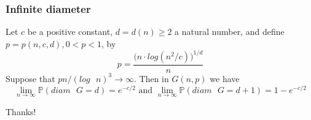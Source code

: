 \documentclass[handout]{beamer}
\theoremstyle{plain}
\renewcommand{\P}{\mathbb{P}}
\begin{document}
\begin{frame}\frametitle{Infinite  diameter}
\begin{theorem}
Let $c$ be a positive constant, $d=d(n)\geq 2$ a natural number, and define $p=p(n,c,d), 0<p<1$, by
$$p = \frac{\big( n\cdot log(n^2/c)\big) ^{1/d}}{n}$$
Suppose that $pn/(log\text{ }n)^{3} \to \infty$. Then in $G(n,p)$ we have
$$\lim_{n\to \infty} \P (diam\text{ }G = d) = e^{-c/2} \text{ and }  \lim_{n\to \infty} \P (diam\text{ }G = d+1) = 1 - e^{-c/2}$$
\end{theorem}
\end{frame}

\begin{frame}
   \begin{center}
       Thanks!
   \end{center} 
\end{frame}
\end{document}
